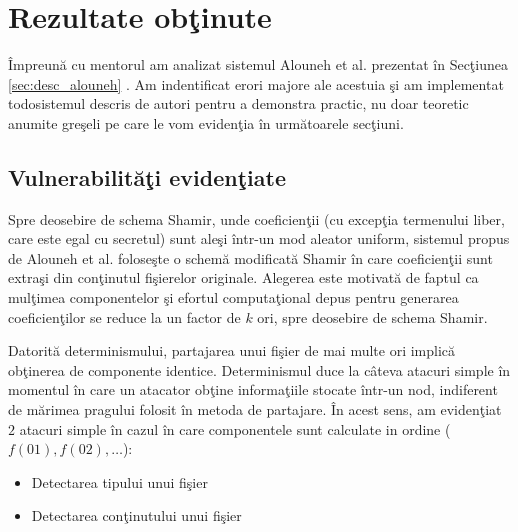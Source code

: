 \documentclass{llncs}
\newcommand{\todo}[1]{{\color{red}{TODO #1}}}
\begin{document}

\todo{poti incerca sa adaugi si aici o imagine}



\section{Rezultate ob\c{t}inute}

\^{I}mpreun\u{a} cu mentorul am analizat sistemul Alouneh et al. prezentat \^{i}n Sec\c{t}iunea \ref{sec:desc_alouneh} \cite{AAMK:2013}.
 Am indentificat erori majore ale acestuia \c{s}i am implementat todosistemul descris de autori pentru a demonstra practic, nu doar teoretic anumite gre\c{s}eli pe care le vom eviden\c{t}ia \^{i}n urm\u{a}toarele sec\c{t}iuni.

\label{sec:results}
\subsection{Vulnerabilit\u{a}\c{t}i eviden\c{t}iate}

Spre deosebire de schema Shamir, unde coeficien\c{t}ii (cu excep\c{t}ia termenului liber, care este egal cu secretul) sunt ale\c{s}i \^{i}ntr-un mod aleator uniform, sistemul propus de Alouneh et al. folose\c{s}te o schem\u{a} modificat\u{a} Shamir \^{i}n care coeficien\c{t}ii sunt extra\c{s}i din con\c{t}inutul fi\c{s}ierelor originale.
Alegerea este motivat\u{a} de faptul ca mul\c{t}imea componentelor \c{s}i efortul computa\c{t}ional depus pentru generarea coeficien\c{t}ilor se reduce la un factor de $k$ ori, spre deosebire de schema Shamir.

Datorit\u{a} determinismului, partajarea unui fi\c{s}ier de mai multe ori implic\u{a} ob\c{t}inerea de componente identice.
Determinismul duce la c\^{a}teva atacuri simple \^{i}n momentul \^{i}n care un atacator ob\c{t}ine informa\c{t}iile stocate \^{i}ntr-un nod, indiferent de m\u{a}rimea pragului folosit \^{i}n metoda de partajare. \^{I}n acest sens, am eviden\c{t}iat $2$ atacuri simple \^{i}n cazul \^{i}n care componentele sunt calculate in ordine ($f(01), f(02), \dots$):
\begin{itemize}
	\item Detectarea tipului unui fi\c{s}ier
	\item Detectarea con\c{t}inutului unui fi\c{s}ier
\end{itemize}
\end{document}
